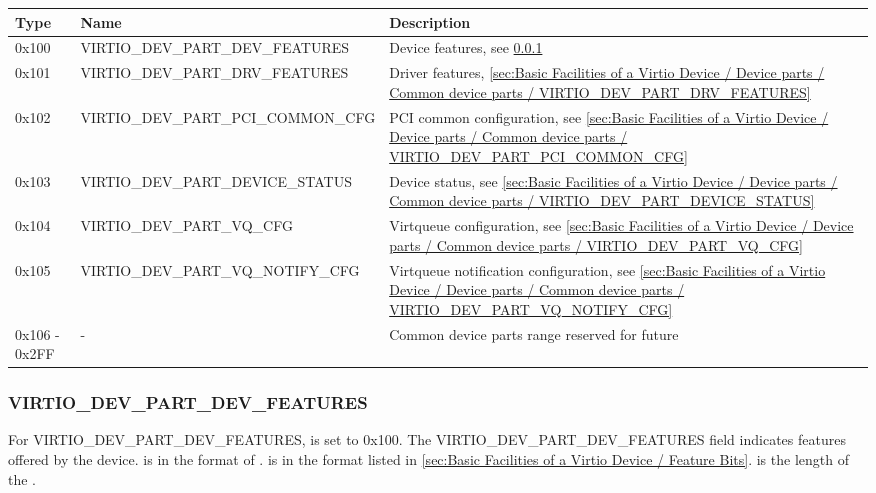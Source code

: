 \begin{table}
\caption{Common device parts}
\label{table:Basic Facilities of a Virtio Device / Device parts / Common device parts}
\begin{xltabular}{\textwidth}{ |l||l|X| }
\hline
Type & Name & Description \\
\hline \hline
0x100 & VIRTIO_DEV_PART_DEV_FEATURES & Device features, see \ref{sec:Basic Facilities of a Virtio Device / Device parts / Common device parts / VIRTIO_DEV_PART_DEV_FEATURES} \\
\hline
0x101 & VIRTIO_DEV_PART_DRV_FEATURES & Driver features, \ref{sec:Basic Facilities of a Virtio Device / Device parts / Common device parts / VIRTIO_DEV_PART_DRV_FEATURES} \\
\hline
0x102 & VIRTIO_DEV_PART_PCI_COMMON_CFG & PCI common configuration, see \ref{sec:Basic Facilities of a Virtio Device / Device parts / Common device parts / VIRTIO_DEV_PART_PCI_COMMON_CFG} \\
\hline
0x103 & VIRTIO_DEV_PART_DEVICE_STATUS & Device status, see \ref{sec:Basic Facilities of a Virtio Device / Device parts / Common device parts / VIRTIO_DEV_PART_DEVICE_STATUS} \\
\hline
0x104 & VIRTIO_DEV_PART_VQ_CFG & Virtqueue configuration, see \ref{sec:Basic Facilities of a Virtio Device / Device parts / Common device parts / VIRTIO_DEV_PART_VQ_CFG} \\
\hline
0x105 & VIRTIO_DEV_PART_VQ_NOTIFY_CFG & Virtqueue notification configuration, see \ref{sec:Basic Facilities of a Virtio Device / Device parts / Common device parts / VIRTIO_DEV_PART_VQ_NOTIFY_CFG} \\
\hline
0x106 - 0x2FF & - & Common device parts range reserved for future \\
\hline
\hline
\end{xltabular}
\end{table}

\subsubsection{VIRTIO_DEV_PART_DEV_FEATURES}
\label{sec:Basic Facilities of a Virtio Device / Device parts / Common device parts / VIRTIO_DEV_PART_DEV_FEATURES}

For VIRTIO_DEV_PART_DEV_FEATURES,  is set to 0x100.
The VIRTIO_DEV_PART_DEV_FEATURES field indicates features offered by the device.
 is in the format of .
 is in the format listed in
\ref{sec:Basic Facilities of a Virtio Device / Feature Bits}.
 is the length of the .

